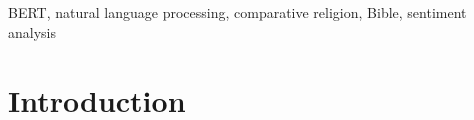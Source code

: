 \documentclass[5p,times]{elsarticle}
\begin{document}
\begin{frontmatter}
\begin{abstract}
\end{abstract}

\begin{keyword} 
  BERT, natural language processing, comparative religion, Bible, sentiment analysis 


\end{keyword}

\end{frontmatter}

\section{Introduction} 




 


 
\end{document}
